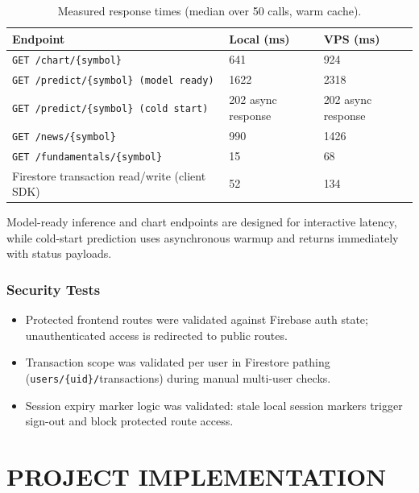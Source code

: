 \documentclass[12pt,a4paper]{report}
\numberwithin{equation}{chapter}
\begin{document}
\begin{table}[H]
\centering
\caption{Measured response times (median over 50 calls, warm cache).}
\label{tab:perf}
\small
\begin{tabular}{|p{6cm}|p{3cm}|p{3cm}|}
\hline
\textbf{Endpoint} & \textbf{Local (ms)} & \textbf{VPS (ms)} \\ \hline
\texttt{GET /chart/\{symbol\}} & 641 & 924 \\ \hline
\texttt{GET /predict/\{symbol\} (model ready)} & 1622 & 2318 \\ \hline
\texttt{GET /predict/\{symbol\} (cold start)} & 202 async response & 202 async response \\ \hline
\texttt{GET /news/\{symbol\}} & 990 & 1426 \\ \hline
\texttt{GET /fundamentals/\{symbol\}} & 15 & 68 \\ \hline
Firestore transaction read/write (client SDK) & 52 & 134 \\ \hline
\end{tabular}
\end{table}

Model-ready inference and chart endpoints are designed for interactive latency, while cold-start prediction uses asynchronous warmup and returns immediately with status payloads.

\subsection{Security Tests}

\begin{itemize}
  \item Protected frontend routes were validated against Firebase auth state; unauthenticated access is redirected to public routes.
  \item Transaction scope was validated per user in Firestore pathing (\texttt{users/\{uid\}/}transactions) during manual multi-user checks.
  \item Session expiry marker logic was validated: stale local session markers trigger sign-out and block protected route access.
\end{itemize}

\chapter{PROJECT IMPLEMENTATION}
\end{document}
